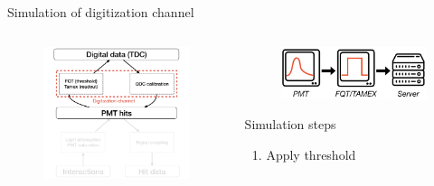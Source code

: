 \documentclass[compress, 13pt, aspectratio=169]{beamer}
\begin{document}
\begin{frame}{Simulation of digitization channel}
    \begin{columns}
        \begin{column}{0.5\textwidth}
            \begin{figure}[t]
                \includegraphics[keepaspectratio, height = 0.8\textheight]{digiFlow/digiFlow.007.png}%
            \end{figure}
        \end{column}
        \begin{column}{0.5\textwidth}
            \begin{figure}[t]
                \includegraphics[keepaspectratio, height = 0.3\textwidth]{PMT2TAMEX.png}%
            \end{figure}
            \pause
            \begin{block}{Simulation steps}
                \begin{enumerate}
                    \item<2-> Apply threshold

\end{enumerate}
\end{block}
\end{column}
\end{columns}
\end{frame}
\end{document}
